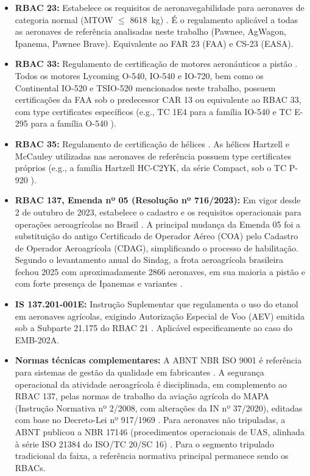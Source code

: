 \documentclass[a4paper,12pt]{article}
\begin{document}
\begin{itemize}
    \item \textbf{RBAC 23:} Estabelece os requisitos de aeronavegabilidade para aeronaves de categoria normal (MTOW $\leq$ \SI{8618}{kg}) \cite{anacrbac23}. É o regulamento aplicável a todas as aeronaves de referência analisadas neste trabalho (Pawnee, AgWagon, Ipanema, Pawnee Brave). Equivalente ao FAR 23 (FAA) e CS-23 (EASA).
    
    \item \textbf{RBAC 33:} Regulamento de certificação de motores aeronáuticos a pistão \cite{anacrbac33}. Todos os motores Lycoming O-540, IO-540 e IO-720, bem como os Continental IO-520 e TSIO-520 mencionados neste trabalho, possuem certificações da FAA sob o predecessor CAR 13 ou equivalente ao RBAC 33, com type certificates específicos (e.g., TC 1E4 para a família IO-540 \cite{faa_tcds_1e4} e TC E-295 para a família O-540 \cite{faa_tcds_e295}).
    
    \item \textbf{RBAC 35:} Regulamento de certificação de hélices \cite{anacrbac35}. As hélices Hartzell e McCauley utilizadas nas aeronaves de referência possuem type certificates próprios (e.g., a família Hartzell HC-C2YK, da série Compact, sob o TC P-920 \cite{faa_tcds_p920}).
    
    \item \textbf{RBAC 137, Emenda nº 05 (Resolução nº 716/2023):} Em vigor desde 2 de outubro de 2023, estabelece o cadastro e os requisitos operacionais para operações aeroagrícolas no Brasil \cite{anac137}. A principal mudança da Emenda 05 foi a substituição do antigo Certificado de Operador Aéreo (COA) pelo Cadastro de Operador Aeroagrícola (CDAG), simplificando o processo de habilitação. Segundo o levantamento anual do Sindag, a frota aeroagrícola brasileira fechou 2025 com aproximadamente \num{2866} aeronaves, em sua maioria a pistão e com forte presença de Ipanemas e variantes \cite{sindag_frota2025}.
    
    \item \textbf{IS 137.201-001E:} Instrução Suplementar que regulamenta o uso do etanol em aeronaves agrícolas, exigindo Autorização Especial de Voo (AEV) emitida sob a Subparte 21.175 do RBAC 21 \cite{anacis137}. Aplicável especificamente ao caso do EMB-202A.
    
    \item \textbf{Normas técnicas complementares:} A ABNT NBR ISO 9001 é referência para sistemas de gestão da qualidade em fabricantes \cite{abnt9001}. A segurança operacional da atividade aeroagrícola é disciplinada, em complemento ao RBAC 137, pelas normas de trabalho da aviação agrícola do MAPA (Instrução Normativa nº 2/2008, com alterações da IN nº 37/2020), editadas com base no Decreto-Lei nº 917/1969 \cite{mapa_in02}. Para aeronaves não tripuladas, a ABNT publicou a NBR 17146 (procedimentos operacionais de UAS, alinhada à série ISO 21384 do ISO/TC 20/SC 16) \cite{abnt17146}. Para o segmento tripulado tradicional da faixa, a referência normativa principal permanece sendo os RBACs.
    

\end{itemize}
\end{document}
